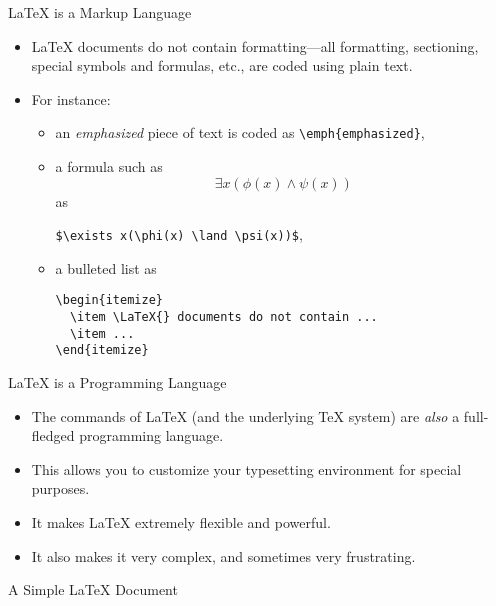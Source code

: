 \begin{frame}[fragile]{\LaTeX{} is a Markup Language}

\begin{itemize}
\item \LaTeX{} documents do not contain formatting---all formatting,
  sectioning, special symbols and formulas, etc., are coded using
  plain text.
\item For instance:
  \begin{itemize}
    \item an \emph{emphasized} piece of text is coded as
      \verb+\emph{emphasized}+,
    \item a formula such as \[\exists x(\phi(x) \land \psi(x))\] as
      \begin{center}
      \verb+$\exists x(\phi(x) \land \psi(x))$+,
      \end{center}
    \item a bulleted list as 
\begin{verbatim}
\begin{itemize}
  \item \LaTeX{} documents do not contain ...
  \item ...
\end{itemize}
\end{verbatim}
  \end{itemize}
\end{itemize}

\end{frame}

\begin{frame}{\LaTeX{} is a Programming Language}

\begin{itemize}
\item The commands of \LaTeX{} (and the underlying \TeX{} system) are
  \emph{also} a full-fledged programming language.
\item This allows you to customize your typesetting environment for
  special purposes.
\item It makes \LaTeX{} extremely flexible and powerful.
\item It also makes it very complex, and sometimes very frustrating.
\end{itemize}
\end{frame}

\begin{frame}{A Simple \LaTeX{} Document}


\end{frame}

